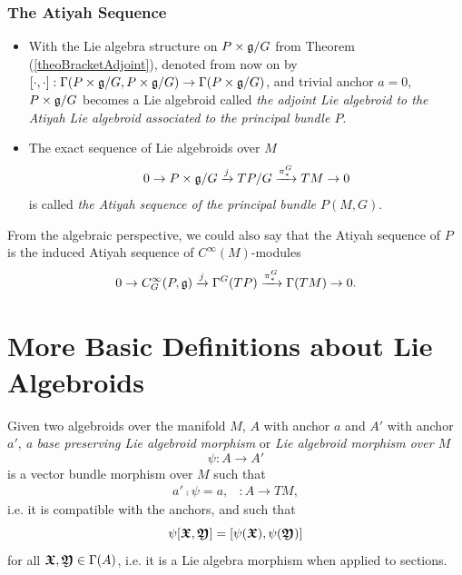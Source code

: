 \subsubsection{The Atiyah Sequence}
\begin{definition}\label{AtiyahSeq}
    \begin{itemize}
    
    \item With the Lie algebra structure on $P \times \mathfrak{g}/G$ from Theorem (\ref{theoBracketAdjoint}), denoted from now on by $[\cdot, \cdot]: \Gamma(P \times \mathfrak{g}/G, P \times \mathfrak{g}/G) \to \Gamma(P \times \mathfrak{g}/G)$, and trivial anchor $a=0$, $P \times \mathfrak{g}/G$ becomes a Lie algebroid called \emph{the adjoint Lie algebroid to the Atiyah Lie algebroid associated to the principal bundle $P$}.
    
    \item The exact sequence of Lie algebroids over $M$
\begin{align} \label{AtiyahSequence}
    0 \to P \times \mathfrak{g}/G \xrightarrow{j} TP/G \xrightarrow{\pi_*^G} TM \to 0
\end{align}
is called \emph{the Atiyah sequence of the principal bundle $P(M, G)$}.
    \end{itemize}

From the algebraic perspective, we could also say that the Atiyah sequence of $P$ is the induced Atiyah sequence of $C^\infty(M)$-modules
\begin{align} \label{AtiyahSequenceSections}
    0 \to C^\infty_G(P, \mathfrak{g}) \xrightarrow{j} \Gamma^G(TP) \xrightarrow{\pi_*^G} \Gamma(TM) \to 0.
\end{align}

\end{definition}


\section{More Basic Definitions about Lie Algebroids}
\begin{definition}  \label{defnMorph}
Given two algebroids over the manifold $M$, $A$ with anchor $a$ and $A'$ with anchor $a'$, \emph{a base preserving Lie algebroid morphism} or \emph{Lie algebroid morphism over $M$} 
\[\psi: A \to A'\]
is a vector bundle morphism over $M$ such that 
\begin{align}
    a' \comp \psi = a, & : A \to TM,
\end{align}
i.e. it is compatible with the anchors, and such that 
\[\psi[\bm{\mathfrak{X}}, \bm{\mathfrak{Y}}] = [\psi(\bm{\mathfrak{X}}), \psi(\bm{\mathfrak{Y}})]\] 
for all $\bm{\mathfrak{X}}, \bm{\mathfrak{Y}} \in \Gamma(A)$, i.e. it is a Lie algebra morphism when applied to sections. 
\end{definition}

